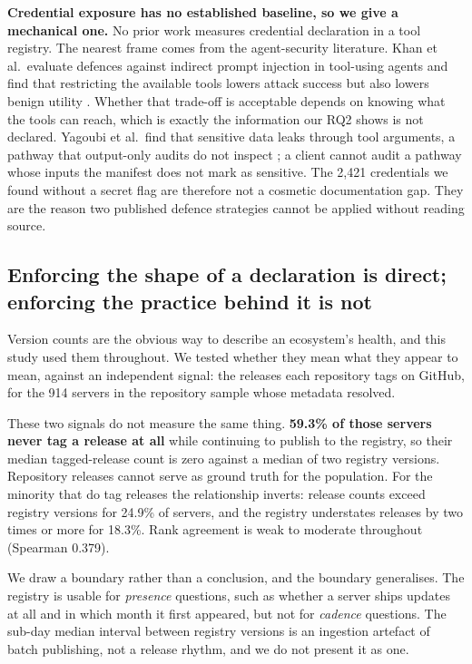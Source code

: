 \documentclass[a4paper,fleqn]{cas-dc}
\begin{document}
\textbf{Credential exposure has no established baseline, so we give a
mechanical one.} No prior work measures credential declaration in a tool
registry. The nearest frame comes from the agent-security literature. Khan et
al.\ evaluate defences against indirect prompt injection in tool-using agents
and find that restricting the available tools lowers attack success but also
lowers benign utility \citep{khan2026promptinjection}. Whether that trade-off is
acceptable depends on knowing what the tools can reach, which is exactly the
information our RQ2 shows is not declared. Yagoubi et al.\ find that sensitive
data leaks through tool arguments, a pathway that output-only audits do not
inspect \citep{yagoubi2026agentleak}; a client cannot audit a pathway whose
inputs the manifest does not mark as sensitive. The 2,421 credentials we found
without a secret flag are therefore not a cosmetic documentation gap. They are
the reason two published defence strategies cannot be applied without reading
source.

\subsection{Enforcing the shape of a declaration is direct; enforcing the
practice behind it is not}\label{sec:t1-test}

Version counts are the obvious way to describe an ecosystem's health, and this
study used them throughout. We tested whether they mean what they appear to
mean, against an independent signal: the releases each repository tags on
GitHub, for the 914 servers in the repository sample whose metadata resolved.

These two signals do not measure the same thing. \textbf{59.3\% of those servers
never tag a release at all} while continuing to publish to the registry, so
their median tagged-release count is zero against a median of two registry
versions. Repository releases cannot serve as ground truth for the population.
For the minority that do tag releases the relationship inverts: release counts
exceed registry versions for 24.9\% of servers, and the registry understates
releases by two times or more for 18.3\%. Rank agreement is weak to moderate
throughout (Spearman 0.379).

We draw a boundary rather than a conclusion, and the boundary generalises. The
registry is usable for \emph{presence} questions, such as whether a server ships
updates at all and in which month it first appeared, but not for \emph{cadence}
questions. The sub-day median interval between registry versions is an ingestion
artefact of batch publishing, not a release rhythm, and we do not present it as
one.
\end{document}
